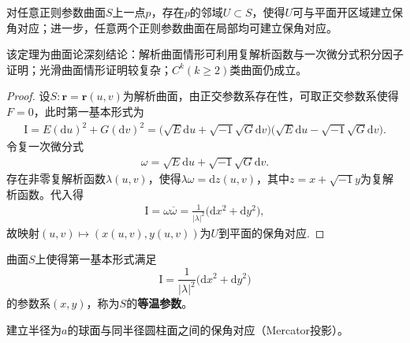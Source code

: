 \documentclass[../../main.tex]{subfiles}%
\begin{document}
\begin{theorem}
对任意正则参数曲面$S$上一点$p$，存在$p$的邻域$U\subset S$，使得$U$可与平面开区域建立保角对应；进一步，任意两个正则参数曲面在局部均可建立保角对应。
\end{theorem}

\begin{remark}
该定理为曲面论深刻结论：解析曲面情形可利用复解析函数与一次微分式积分因子证明；光滑曲面情形证明较复杂；$C^k(k\geqslant2)$类曲面仍成立。
\end{remark}

\begin{proof}

设$S:\bm r=\bm r(u,v)$为解析曲面，由正交参数系存在性，可取正交参数系使得$F=0$，此时第一基本形式为
\begin{align*}
\mathrm{I}=E(\mathrm{d}u)^2+G(\mathrm{d}v)^2=\big(\sqrt{E}\mathrm{d}u+\sqrt{-1}\sqrt{G}\mathrm{d}v\big)\big(\sqrt{E}\mathrm{d}u-\sqrt{-1}\sqrt{G}\mathrm{d}v\big).
\end{align*}
令复一次微分式
\begin{align}
\omega=\sqrt{E}\mathrm{d}u+\sqrt{-1}\sqrt{G}\mathrm{d}v.
\label{eq:complexdiff}
\end{align}
存在非零复解析函数$\lambda(u,v)$，使得$\lambda\omega=\mathrm{d}z(u,v)$，其中$z= x+\sqrt{-1}y$为复解析函数。代入得
\begin{align*}
\mathrm{I}=\omega\overline{\omega}=\frac{1}{|\lambda|^2}\big(\mathrm{d}x^2+\mathrm{d}y^2\big),
\end{align*}
故映射$(u,v)\mapsto(x(u,v),y(u,v))$为$U$到平面的保角对应.

\end{proof}

\begin{definition}
曲面$S$上使得第一基本形式满足
$$\mathrm{I}=\frac{1}{|\lambda|^2}\big(\mathrm{d}x^2+\mathrm{d}y^2\big)$$
的参数系$(x,y)$，称为$S$的\textbf{等温参数}。
\end{definition}

\begin{example}
建立半径为$a$的球面与同半径圆柱面之间的保角对应（Mercator投影）。
\end{example}
\end{document}
